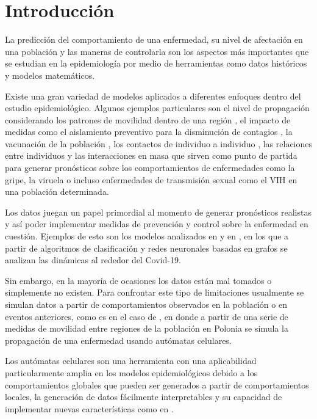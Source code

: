 \chapter{Introducción}\label{ch;Introduccion}

La predicción del comportamiento de una enfermedad, su nivel de afectación en una población y las maneras de controlarla son los aspectos más importantes que se estudian en la epidemiología por medio de herramientas como datos históricos y modelos matemáticos.

Existe una gran variedad de modelos aplicados a diferentes enfoques dentro del estudio epidemiológico. Algunos ejemplos particulares son el nivel de propagación considerando los patrones de movilidad dentro de una región \cite{colaGNN, epidemiologicalNeuralNetwork}, el impacto de medidas como el aislamiento preventivo para la disminución de contagios \cite{stayHome}, la vacunación de la población \cite{shortHistory}, los contactos de individuo a individuo \cite{heterogeneousPopulation}, las relaciones entre individuos \cite{redesComplejas} y las interacciones en masa \cite{combiningGraph, transfer2021} que sirven como punto de partida para generar pronósticos sobre los comportamientos de enfermedades como la gripe, la viruela o incluso enfermedades de transmisión sexual como el VIH en una población determinada.

Los datos juegan un papel primordial al momento de generar pronósticos realistas y así poder implementar medidas de prevención y control sobre la enfermedad en cuestión. Ejemplos de esto son los modelos analizados en \cite{epidemiologicalNeuralNetwork, combiningGraph, forecasting} y en \cite{transfer2021}, en los que a partir de algoritmos de clasificación y redes neuronales basadas en grafos se analizan las dinámicas al rededor del Covid-19.

Sin embargo, en la mayoría de ocasiones los datos están mal tomados o simplemente no existen. Para confrontar este tipo de limitaciones usualmente se simulan datos a partir de comportamientos observados en la población o en eventos anteriores, como es en el caso de \cite{populationDensity}, en donde a partir de una serie de medidas de movilidad entre regiones de la población en Polonia se simula la propagación de una enfermedad usando autómatas celulares.

Los autómatas celulares son una herramienta con una aplicabilidad particularmente amplia en los modelos epidemiológicos debido a los comportamientos globales que pueden ser generados a partir de comportamientos locales, la generación de datos fácilmente interpretables y su capacidad de implementar nuevas características como en \cite{spatialDependences, populationDensity, globalStochastic}.


